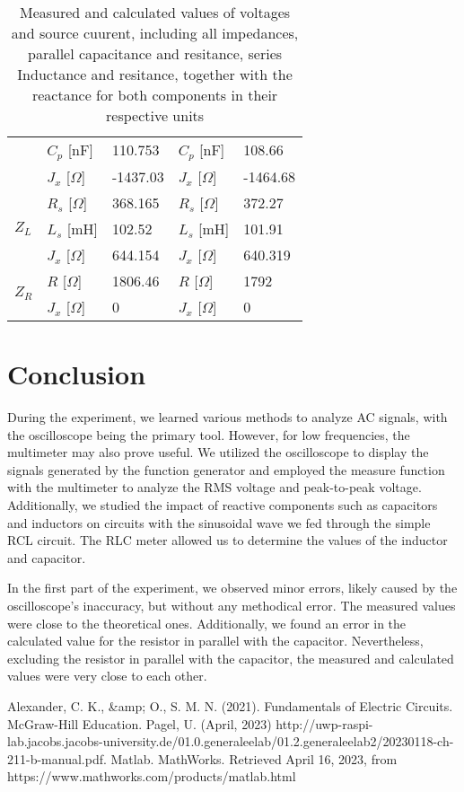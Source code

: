 \documentclass[12pt]{report}
\begin{document}
\begin{table}[ht]
\begin{tabular}{|p{2.7cm}|p{2.6cm}|p{2.6cm}|p{2.5cm}|p{2.5cm}|}
& $C_p$ [nF] & 110.753 &  $C_p$ [nF] & 108.66\\
& $J_x$ [$\Omega$] & -1437.03 & $J_x$ [$\Omega$] & -1464.68 \\
\cline{2-5}
\hline
\multirow{3}{*}{\textbf{$Z_L$}} & $R_s$ [$\Omega$] & 368.165 & $R_s$ [$\Omega$] & 372.27 \\
& $L_s$ [mH] & 102.52 &  $L_s$ [mH] & 101.91 \\
& $J_x$ [$\Omega$] & 644.154 & $J_x$ [$\Omega$] & 640.319 \\
\cline{2-5}
\hline
\multirow{2}{*}{\textbf{$Z_R$}} & $R$ [$\Omega$] & 1806.46 & $R$ [$\Omega$] & 1792 \\
& $J_x$ [$\Omega$] & 0 & $J_x$ [$\Omega$] & 0 \\
\cline{2-5}
\hline
\end{tabular}
\caption{Measured and calculated values of voltages and source cuurent, including all impedances, parallel capacitance and resitance, series Inductance and resitance, together with the reactance for both components in their respective units}
\end{table}
\chapter{Conclusion}
During the experiment, we learned various methods to analyze AC signals, with the oscilloscope being the primary tool. However, for low frequencies, the multimeter may also prove useful. We utilized the oscilloscope to display the signals generated by the function generator and employed the measure function with the multimeter to analyze the RMS voltage and peak-to-peak voltage. Additionally, we studied the impact of reactive components such as capacitors and inductors on circuits with the sinusoidal wave we fed through the simple RCL circuit. The RLC meter allowed us to determine the values of the inductor and capacitor.

In the first part of the experiment, we observed minor errors, likely caused by the oscilloscope's inaccuracy, but without any methodical error. The measured values were close to the theoretical ones. Additionally, we found an error in the calculated value for the resistor in parallel with the capacitor. Nevertheless, excluding the resistor in parallel with the capacitor, the measured and calculated values were very close to each other.
\setcounter{chapter}{6}
\begin{thebibliography}{9}
Alexander, C. K., \&amp; O., S. M. N. (2021). Fundamentals of Electric Circuits. McGraw-Hill Education.
Pagel, U. (April, 2023) http://uwp-raspi-lab.jacobs.jacobs-university.de/01.0.generaleelab/01.2.generaleelab2/20230118-ch-211-b-manual.pdf.
Matlab. MathWorks. Retrieved April 16, 2023, from https://www.mathworks.com/products/matlab.html 
\end{thebibliography}
\end{document}
